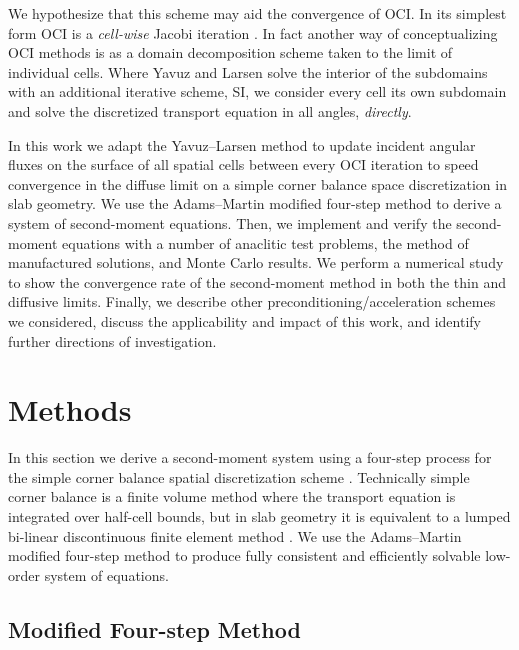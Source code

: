 We hypothesize that this scheme may aid the convergence of OCI.
In its simplest form OCI is a \emph{cell-wise} Jacobi iteration \cite{rosa_cellwise_2013}.
In fact another way of conceptualizing OCI methods is as a domain decomposition scheme taken to the limit of individual cells.
Where Yavuz and Larsen solve the interior of the subdomains with an additional iterative scheme, SI, we consider every cell its own subdomain and solve the discretized transport equation in all angles, \emph{directly}.

In this work we adapt the Yavuz--Larsen method to update incident angular fluxes on the surface of all spatial cells between every OCI iteration to speed convergence in the diffuse limit on a simple corner balance space discretization in slab geometry.
We use the Adams--Martin modified four-step method to derive a system of second-moment equations.
Then, we implement and verify the second-moment equations with a number of anaclitic test problems, the method of manufactured solutions, and Monte Carlo results.
We perform a numerical study to show the convergence rate of the second-moment method in both the thin and diffusive limits.
Finally, we describe other preconditioning/acceleration schemes we considered, discuss the applicability and impact of this work, and identify further directions of investigation.


\section{Methods}
\label{sec:methods}

In this section we derive a second-moment system using a four-step process for the simple corner balance spatial discretization scheme \cite{adams_subcell_1997}.
Technically simple corner balance is a finite volume method where the transport equation is integrated over half-cell bounds, but in slab geometry it is equivalent to a lumped bi-linear discontinuous finite element method \cite{adams_subcell_1997}.
We use the Adams--Martin modified four-step method to produce fully consistent and efficiently solvable low-order system of equations.

\subsection{Modified Four-step Method}
\label{sec:modified4step}

